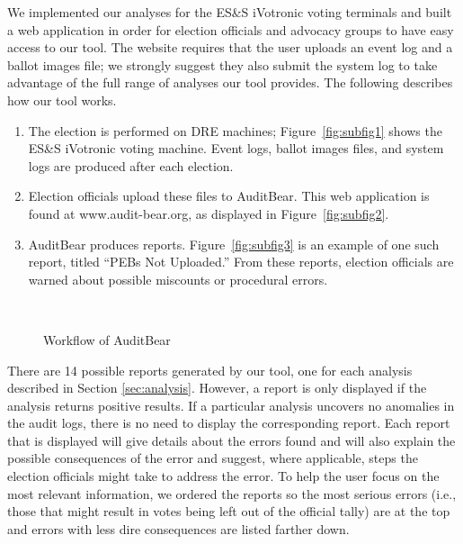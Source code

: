 \smvertspace
We implemented our analyses for the ES\&S iVotronic voting terminals
and built a web application in order for election officials and
advocacy groups to have easy access to our tool. The website requires
that the user uploads an event log and a ballot images file; we strongly
suggest they also submit the system log to take advantage of the
full range of analyses our tool provides.  The following describes how
our tool works.   

\begin{enumerate}
\item
The election is performed on DRE machines; Figure~\ref{fig:subfig1} shows the ES\&S iVotronic voting machine.  Event logs, ballot images files, and system logs are produced after each election.
\item
Election officials upload these files to AuditBear.  This web application is found at www.audit-bear.org, as displayed in Figure~\ref{fig:subfig2}.  
\item
AuditBear produces reports.  Figure~\ref{fig:subfig3} is an example of
one such report, titled ``PEBs Not Uploaded.'' From these reports,
election officials are 
warned about possible miscounts or procedural errors.  
\end{enumerate}

\begin{figure}
\centering
\mbox{
}
\caption{Workflow of AuditBear}
\label{auditBear}
\end{figure}


There are 14 possible reports generated by our tool, one
for each analysis described in Section \ref{sec:analysis}. However, a report is only
displayed if the analysis returns positive results. If a particular
analysis uncovers no anomalies in the audit logs, there is no need to display the
corresponding report. Each report that is displayed will give details
about the errors found and will
also explain the possible consequences of the error and suggest, where
applicable, steps the election officials might take to address
the error. To help the user focus on the most relevant information, we
ordered the reports so the most serious errors (i.e., those that might
result in votes being left out of the official tally) are at the top
and errors with less dire consequences are listed farther down. 

